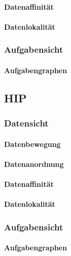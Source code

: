 \paragraph{Datenaffinität}

\paragraph{Datenlokalität}

\subsubsection{Aufgabensicht}

\paragraph{Aufgabengraphen}

\subsection{HIP}

\subsubsection{Datensicht}

\paragraph{Datenbewegung}

\paragraph{Datenanordnung}

\paragraph{Datenaffinität}

\paragraph{Datenlokalität}

\subsubsection{Aufgabensicht}

\paragraph{Aufgabengraphen}

